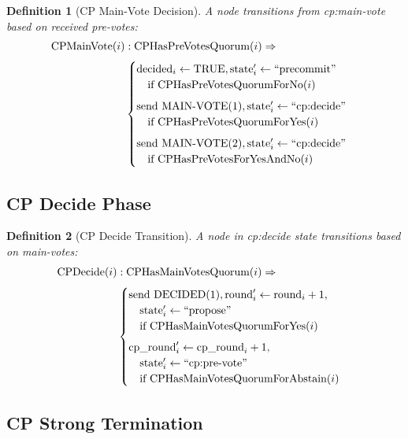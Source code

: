\documentclass[11pt,a4paper,twoside]{article}
\newtheorem{definition}{Definition}[section]
\begin{document}
\begin{definition}[CP Main-Vote Decision]
A node transitions from cp:main-vote based on received pre-votes:
\begin{align}
\text{CPMainVote}(i) &: \text{CPHasPreVotesQuorum}(i) \Rightarrow \notag \\[0.3em]
&\begin{cases}
\text{decided}_i \gets \text{TRUE}, \text{state}'_i \gets \text{``precommit''} & \\
\quad \text{if CPHasPreVotesQuorumForNo}(i) \\[0.5em]
\text{send MAIN-VOTE}(1), \text{state}'_i \gets \text{``cp:decide''} & \\
\quad \text{if CPHasPreVotesQuorumForYes}(i) \\[0.5em]
\text{send MAIN-VOTE}(2), \text{state}'_i \gets \text{``cp:decide''} & \\
\quad \text{if CPHasPreVotesForYesAndNo}(i)
\end{cases}
\end{align}
\end{definition}

\subsection{CP Decide Phase}

\begin{definition}[CP Decide Transition]
A node in cp:decide state transitions based on main-votes:
\begin{align}
\text{CPDecide}(i) &: \text{CPHasMainVotesQuorum}(i) \Rightarrow \notag \\[0.3em]
&\begin{cases}
\text{send DECIDED}(1), \text{round}'_i \gets \text{round}_i + 1, & \\
\quad \text{state}'_i \gets \text{``propose''} & \\
\quad \text{if CPHasMainVotesQuorumForYes}(i) \\[0.5em]
\text{cp\_round}'_i \gets \text{cp\_round}_i + 1, & \\
\quad \text{state}'_i \gets \text{``cp:pre-vote''} & \\
\quad \text{if CPHasMainVotesQuorumForAbstain}(i)
\end{cases}
\end{align}
\end{definition}

\subsection{CP Strong Termination}
\end{document}
